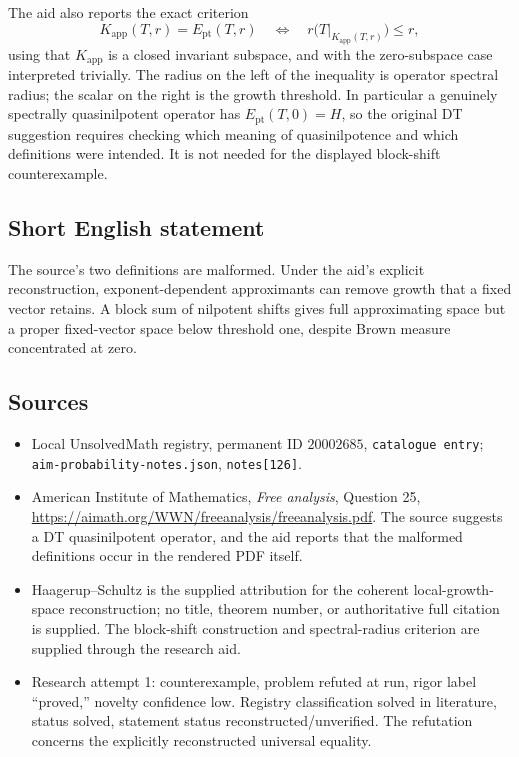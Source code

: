 \documentclass[11pt]{article}
\begin{document}
The aid also reports the exact criterion
\[
K_{\mathrm{app}}(T,r)=E_{\mathrm{pt}}(T,r)
\quad\Longleftrightarrow\quad
r\bigl(T|_{K_{\mathrm{app}}(T,r)}\bigr)\leq r,
\]
using that $K_{\mathrm{app}}$ is a closed invariant subspace, and with the zero-subspace case interpreted trivially. The radius on the left of the inequality is operator spectral radius; the scalar on the right is the growth threshold. In particular a genuinely spectrally quasinilpotent operator has $E_{\mathrm{pt}}(T,0)=H$, so the original DT suggestion requires checking which meaning of quasinilpotence and which definitions were intended. It is not needed for the displayed block-shift counterexample.
\subsection{Short English statement}
The source's two definitions are malformed. Under the aid's explicit reconstruction, exponent-dependent approximants can remove growth that a fixed vector retains. A block sum of nilpotent shifts gives full approximating space but a proper fixed-vector space below threshold one, despite Brown measure concentrated at zero.
\subsection{Sources}
\begin{itemize}
\item Local UnsolvedMath registry, permanent ID $20002685$, \texttt{catalogue entry}; \texttt{aim-probability-notes.json}, \texttt{notes[126]}.
\item American Institute of Mathematics, \emph{Free analysis}, Question 25, \url{https://aimath.org/WWN/freeanalysis/freeanalysis.pdf}. The source suggests a DT quasinilpotent operator, and the aid reports that the malformed definitions occur in the rendered PDF itself.
\item Haagerup--Schultz is the supplied attribution for the coherent local-growth-space reconstruction; no title, theorem number, or authoritative full citation is supplied. The block-shift construction and spectral-radius criterion are supplied through the research aid.
\item Research attempt 1: counterexample, problem refuted at run, rigor label ``proved,'' novelty confidence low. Registry classification solved in literature, status solved, statement status reconstructed/unverified. The refutation concerns the explicitly reconstructed universal equality.
\end{itemize}
\end{document}
